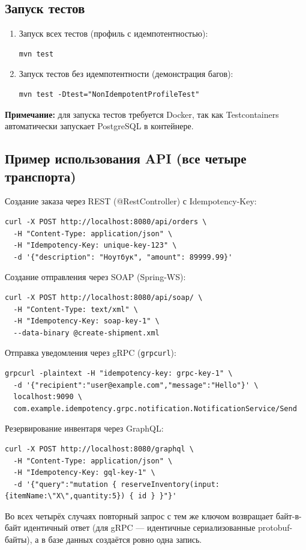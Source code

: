 \subsection{Запуск тестов}

\begin{enumerate}
    \item Запуск всех тестов (профиль с идемпотентностью):
\begin{verbatim}
mvn test
\end{verbatim}

    \item Запуск тестов без идемпотентности (демонстрация багов):
\begin{verbatim}
mvn test -Dtest="NonIdempotentProfileTest"
\end{verbatim}
\end{enumerate}

\textbf{Примечание:} для запуска тестов требуется Docker, так как Testcontainers автоматически запускает PostgreSQL в контейнере.

\subsection{Пример использования API (все четыре транспорта)}

Создание заказа через REST (@RestController) с Idempotency-Key:
\begin{verbatim}
curl -X POST http://localhost:8080/api/orders \
  -H "Content-Type: application/json" \
  -H "Idempotency-Key: unique-key-123" \
  -d '{"description": "Ноутбук", "amount": 89999.99}'
\end{verbatim}

Создание отправления через SOAP (Spring-WS):
\begin{verbatim}
curl -X POST http://localhost:8080/api/soap/ \
  -H "Content-Type: text/xml" \
  -H "Idempotency-Key: soap-key-1" \
  --data-binary @create-shipment.xml
\end{verbatim}

Отправка уведомления через gRPC (\texttt{grpcurl}):
\begin{verbatim}
grpcurl -plaintext -H "idempotency-key: grpc-key-1" \
  -d '{"recipient":"user@example.com","message":"Hello"}' \
  localhost:9090 \
  com.example.idempotency.grpc.notification.NotificationService/Send
\end{verbatim}

Резервирование инвентаря через GraphQL:
\begin{verbatim}
curl -X POST http://localhost:8080/graphql \
  -H "Content-Type: application/json" \
  -H "Idempotency-Key: gql-key-1" \
  -d '{"query":"mutation { reserveInventory(input:{itemName:\"X\",quantity:5}) { id } }"}'
\end{verbatim}

Во всех четырёх случаях повторный запрос с тем же ключом возвращает байт-в-байт идентичный ответ (для gRPC --- идентичные сериализованные protobuf-байты), а в базе данных создаётся ровно одна запись.
